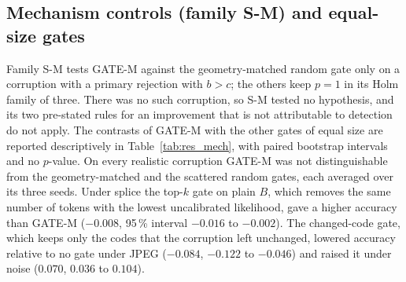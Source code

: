 \subsection{Mechanism controls (family S-M) and equal-size gates}\label{ssec:res_mech}
Family S-M tests GATE-M against the geometry-matched random gate only on a corruption with a primary rejection with $b>c$; the others
keep $p=1$ in its Holm family of three.
There was no such corruption, so S-M tested no hypothesis, and its two pre-stated rules for an improvement that is not attributable to
detection do not apply.
The contrasts of GATE-M with the other gates of equal size are reported descriptively in Table~\ref{tab:res_mech}, with paired
bootstrap intervals and no $p$-value.
On every realistic corruption GATE-M was not distinguishable from the geometry-matched and the scattered random gates, each averaged
over its three seeds.
Under splice the top-$k$ gate on plain $B$, which removes the same number of tokens with the lowest uncalibrated likelihood, gave a
higher accuracy than GATE-M ($-0.008$, 95\,\% interval $-0.016$ to $-0.002$).
The changed-code gate, which keeps only the codes that the corruption left unchanged, lowered accuracy relative to no gate under
JPEG ($-0.084$, $-0.122$ to $-0.046$) and raised it under noise ($0.070$, $0.036$ to $0.104$).


